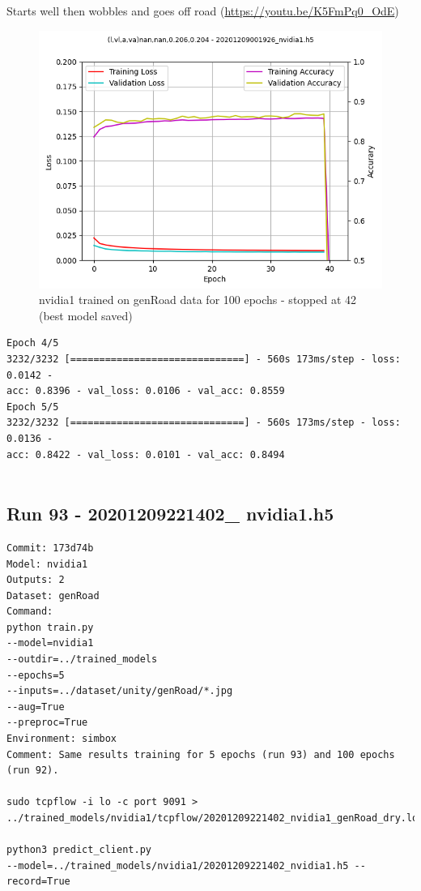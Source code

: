Starts well then wobbles and goes off road (\url{https://youtu.be/K5FmPq0_OdE})
\begin{figure}[ht]
 \centering 
 \includegraphics[width=\textwidth]{Figures/20201209001926_nvidia1_accuracy.png}
 \caption{nvidia1 trained on genRoad data for 100 epochs - stopped at 42 (best model saved)}
 \label{fig:20201209001926_nvidia1_accuracy} 
\end{figure}


\begin{verbatim}
Epoch 4/5
3232/3232 [==============================] - 560s 173ms/step - loss: 0.0142 - 
acc: 0.8396 - val_loss: 0.0106 - val_acc: 0.8559
Epoch 5/5
3232/3232 [==============================] - 560s 173ms/step - loss: 0.0136 - 
acc: 0.8422 - val_loss: 0.0101 - val_acc: 0.8494
    
\end{verbatim}

\subsection{Run 93 - 20201209221402\_ nvidia1.h5 }
\begin{verbatim}
Commit: 173d74b
Model: nvidia1
Outputs: 2
Dataset: genRoad
Command:
python train.py
--model=nvidia1
--outdir=../trained_models
--epochs=5
--inputs=../dataset/unity/genRoad/*.jpg
--aug=True
--preproc=True
Environment: simbox
Comment: Same results training for 5 epochs (run 93) and 100 epochs (run 92).

sudo tcpflow -i lo -c port 9091 >
../trained_models/nvidia1/tcpflow/20201209221402_nvidia1_genRoad_dry.log

python3 predict_client.py 
--model=../trained_models/nvidia1/20201209221402_nvidia1.h5 --record=True
\end{verbatim}

